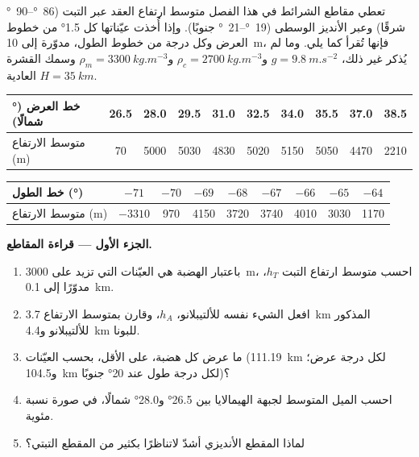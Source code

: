 \begin{problem}\label{pb:b2:himalaya-andes:1}
تعطي مقاطع الشرائط في هذا الفصل متوسط ارتفاع العقد عبر التبت
(\qtyrange{86}{90}{\degree} شرقًا) وعبر الأنديز الوسطى (\qtyrange{19}{21}{\degree} جنوبًا).
وإذا أُخذت عيّناتها كل \ang{1.5} من خطوط العرض وكل درجة من خطوط الطول، مدوّرة إلى \qty{10}{m}، فإنها
تُقرأ كما يلي. وما لم يُذكر غير ذلك، $g = \qty{9.8}{m.s^{-2}}$ و$\rho_c = \qty{2700}{kg.m^{-3}}$
و$\rho_m = \qty{3300}{kg.m^{-3}}$ وسمك القشرة العادية $H = \qty{35}{km}$.

\smallskip
\begin{center}\small
\begin{tabular}{l|ccccccccc}
خط العرض (\unit{\degree} شمالًا) & 26.5 & 28.0 & 29.5 & 31.0 & 32.5 & 34.0 & 35.5 & 37.0 & 38.5 \\ \hline
متوسط الارتفاع (\unit{m}) & 70 & 5000 & 5030 & 4830 & 5020 & 5150 & 5050 & 4470 & 2210
\end{tabular}

\smallskip
\begin{tabular}{l|cccccccc}
خط الطول (\unit{\degree}) & $-71$ & $-70$ & $-69$ & $-68$ & $-67$ & $-66$ & $-65$ & $-64$ \\ \hline
متوسط الارتفاع (\unit{m}) & $-3310$ & 970 & 4150 & 3720 & 3740 & 4010 & 3030 & 1170
\end{tabular}
\end{center}
\smallskip

\noindent\textbf{الجزء الأول --- قراءة المقاطع.}
\begin{enumerate}
\item باعتبار الهضبة هي العيّنات التي تزيد على \qty{3000}{m}، احسب متوسط ارتفاع التبت
$h_T$، مدوّرًا إلى \qty{0.1}{km}.
\item افعل الشيء نفسه للألتيبلانو، $h_A$، وقارن بمتوسط الارتفاع
\qty{3.7}{km} المذكور للألتيبلانو و\qty{4.4}{km} للبونا.
\item ما عرض كل هضبة، على الأقل، بحسب العيّنات (\qty{111.19}{km} لكل
درجة عرض؛ و\qty{104.5}{km} لكل درجة طول عند \ang{20} جنوبًا)؟
\item احسب الميل المتوسط لجبهة الهيمالايا بين \ang{26.5} و\ang{28.0} شمالًا، في صورة
نسبة مئوية.
\item لماذا المقطع الأنديزي أشدّ لاتناظرًا بكثير من المقطع التبتي؟
\end{enumerate}


\end{problem}
